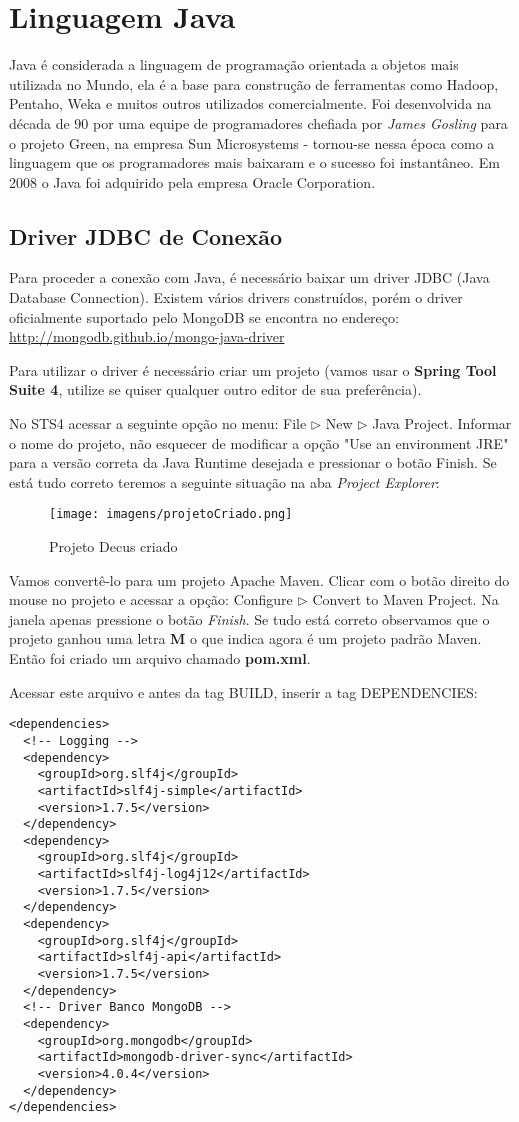 \section{Linguagem Java}
Java é considerada a linguagem de programação orientada a objetos mais utilizada no Mundo, ela é a base para construção de ferramentas como Hadoop, Pentaho, Weka e muitos outros utilizados comercialmente. Foi desenvolvida na década de 90 por uma equipe de programadores chefiada por \textit{James Gosling} para o projeto Green, na empresa Sun Microsystems - tornou-se nessa época como a linguagem que os programadores mais baixaram e o sucesso foi instantâneo. Em 2008 o Java foi adquirido pela empresa Oracle Corporation.

\subsection{Driver JDBC de Conexão}
Para proceder a conexão com Java, é necessário baixar um driver JDBC (Java Database Connection). Existem vários drivers construídos, porém o driver oficialmente suportado pelo MongoDB se encontra no endereço: \url{http://mongodb.github.io/mongo-java-driver}

Para utilizar o driver é necessário criar um projeto (vamos usar o \textbf{Spring Tool Suite 4}, utilize se quiser qualquer outro editor de sua preferência).

No STS4 acessar a seguinte opção no menu: File $\triangleright$ New $\triangleright$ Java Project. Informar o nome do projeto, não esquecer de modificar a opção "Use an environment JRE" para a versão correta da Java Runtime desejada e pressionar o botão Finish. Se está tudo correto teremos a seguinte situação na aba \textit{Project Explorer}:
\begin{figure}[H]
	\centering
	\texttt{[image: imagens/projetoCriado.png]}
	\caption{Projeto Decus criado}
\end{figure}

Vamos convertê-lo para um projeto Apache Maven. Clicar com o botão direito do mouse no projeto e acessar a opção: Configure $\triangleright$ Convert to Maven Project. Na janela apenas pressione o botão \textit{Finish}. Se tudo está correto observamos que o projeto ganhou uma letra \textbf{M} o que indica agora é um projeto padrão Maven. Então foi criado um arquivo chamado \textbf{pom.xml}. 

Acessar este arquivo e antes da tag BUILD, inserir a tag DEPENDENCIES:
\begin{lstlisting}[]
<dependencies>
  <!-- Logging -->
  <dependency>
    <groupId>org.slf4j</groupId>
    <artifactId>slf4j-simple</artifactId>
    <version>1.7.5</version>
  </dependency>
  <dependency>
    <groupId>org.slf4j</groupId>
    <artifactId>slf4j-log4j12</artifactId>
    <version>1.7.5</version>
  </dependency>
  <dependency>
    <groupId>org.slf4j</groupId>
    <artifactId>slf4j-api</artifactId>
    <version>1.7.5</version>
  </dependency>
  <!-- Driver Banco MongoDB -->
  <dependency>
    <groupId>org.mongodb</groupId>
    <artifactId>mongodb-driver-sync</artifactId>
    <version>4.0.4</version>
  </dependency>
</dependencies>
\end{lstlisting}

